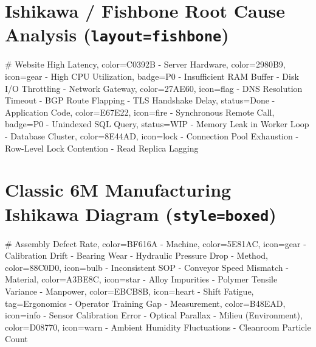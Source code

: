 \documentclass{article}
\begin{document}
\section*{Ishikawa / Fishbone Root Cause Analysis (\texttt{layout=fishbone})}

\begin{mindchart}[theme=rainbow, layout=fishbone, style=classic, scale=0.85]
# Website High Latency, color=C0392B
  - Server Hardware, color=2980B9, icon=gear
    - High CPU Utilization, badge=P0
    - Insufficient RAM Buffer
    - Disk I/O Throttling
  - Network Gateway, color=27AE60, icon=flag
    - DNS Resolution Timeout
    - BGP Route Flapping
    - TLS Handshake Delay, status=Done
  - Application Code, color=E67E22, icon=fire
    - Synchronous Remote Call, badge=P0
    - Unindexed SQL Query, status=WIP
    - Memory Leak in Worker Loop
  - Database Cluster, color=8E44AD, icon=lock
    - Connection Pool Exhaustion
    - Row-Level Lock Contention
    - Read Replica Lagging
\end{mindchart}

\newpage

\section*{Classic 6M Manufacturing Ishikawa Diagram (\texttt{style=boxed})}

\begin{mindchart}[theme=nord, layout=ishikawa, style=boxed, scale=0.75]
# Assembly Defect Rate, color=BF616A
  - Machine, color=5E81AC, icon=gear
    - Calibration Drift
    - Bearing Wear
    - Hydraulic Pressure Drop
  - Method, color=88C0D0, icon=bulb
    - Inconsistent SOP
    - Conveyor Speed Mismatch
  - Material, color=A3BE8C, icon=star
    - Alloy Impurities
    - Polymer Tensile Variance
  - Manpower, color=EBCB8B, icon=heart
    - Shift Fatigue, tag=Ergonomics
    - Operator Training Gap
  - Measurement, color=B48EAD, icon=info
    - Sensor Calibration Error
    - Optical Parallax
  - Milieu (Environment), color=D08770, icon=warn
    - Ambient Humidity Fluctuations
    - Cleanroom Particle Count
\end{mindchart}
\end{document}
